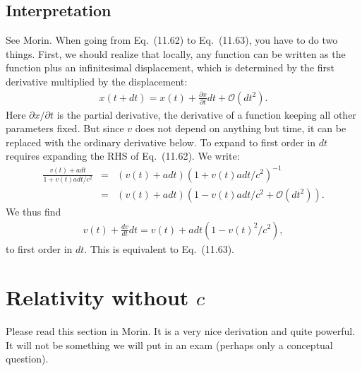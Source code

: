 \documentclass[12pt]{article}
\newcommand{\be}{\begin{eqnarray}}
\newcommand{\ee}{\end{eqnarray}}
\newif\ifshowboardanswers
\newif\ifshowboardquestion
\newcommand{\boardanswer}[1]{\ifshowboardanswers\\[0.35em]\textcolor{blue}{\textbf{Answer.} #1}\fi}
\begin{document}
\subsection{Interpretation}
See Morin. When going from Eq.~(11.62) to Eq.~(11.63), you have to do two things. First, we should realize that locally, any function can be written as the function plus an infinitesimal displacement, which is determined by the first derivative multiplied by the displacement:
\be
x(t + d t) = x(t) + \frac{\partial x}{\partial t} d t + \mathcal{O}(d t^2).
\ee
Here $\partial x /\partial t$ is the partial derivative, the derivative of a function keeping all other parameters fixed. But since $v$ does not depend on anything but time, it can be replaced with the ordinary derivative below. To expand to first order in $dt$ requires expanding the RHS of Eq.~(11.62). We write:
\be
\frac{v(t) + a dt}{1+ v(t) a dt/c^2} &=& (v(t) + a dt)(1+v(t) a dt/c^2)^{-1}\nonumber \\
&=& (v(t) + a dt)(1 - v(t) a dt/c^2 + \mathcal{O}(dt^2)).
\ee
We thus find
\be
v(t) + \frac{dv}{dt} dt = v(t) + a dt( 1 - v(t)^2/c^2),
\ee
to first order in $dt$. This is equivalent to Eq.~(11.63).

\section{Relativity without $c$}
Please read this section in Morin. It is a very nice derivation and quite powerful. It will not be something we will put in an exam (perhaps only a conceptual question).


\ifshowboardquestion
\section*{Board Question}
\begin{tcolorbox}[colback=blue!5!white]
A source moves directly away from Earth with $\beta_u=0.60$ and emits light with wavelength $\lambda_{\rm em}=500\,{\rm nm}$ in its own rest frame.
\begin{enumerate}
    \item Compute the observed wavelength on Earth using the relativistic Doppler formula.
    \boardanswer{For recession, $\lambda_{\rm obs}=\lambda_{\rm em}\sqrt{(1+\beta_u)/(1-\beta_u)}=500\,{\rm nm}\sqrt{1.6/0.4}=1000\,{\rm nm}$.}
    \item Express the same boost using a rapidity $\phi_u$.
    \boardanswer{$\tanh\phi_u=\beta_u=0.60$, so $\phi_u=\tanh^{-1}(0.60)=\frac12\ln(4)=\ln 2$.}
    \item A second source moves away from the first with $\beta_{u_2}=0.60$. Use rapidities to find the speed of the second source relative to Earth.
    \boardanswer{Rapidities add: $\phi_{u,\rm tot}=2\ln 2=\ln 4$. Thus $\beta_{u,\rm tot}=\tanh(\ln 4)=15/17\simeq0.88$.}
    \item Explain why ordinary addition of the two speeds would give an impossible answer.
    \boardanswer{Ordinary addition gives $1.2c$, which exceeds the speed of light. In SR, rapidities add linearly while velocities combine nonlinearly.}
\end{enumerate}
\end{tcolorbox}
\fi
\end{document}
